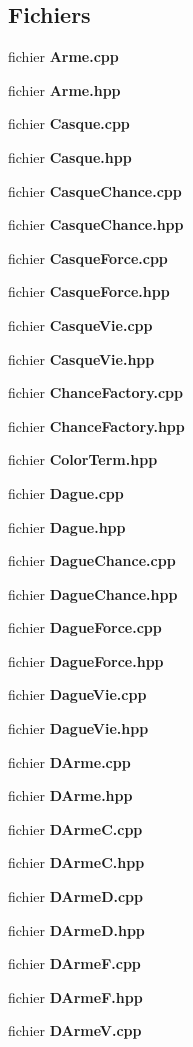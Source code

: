 \subsection*{Fichiers}
\begin{DoxyCompactItemize}
\item 
fichier {\bf Arme.\-cpp}
\item 
fichier {\bf Arme.\-hpp}
\item 
fichier {\bf Casque.\-cpp}
\item 
fichier {\bf Casque.\-hpp}
\item 
fichier {\bf Casque\-Chance.\-cpp}
\item 
fichier {\bf Casque\-Chance.\-hpp}
\item 
fichier {\bf Casque\-Force.\-cpp}
\item 
fichier {\bf Casque\-Force.\-hpp}
\item 
fichier {\bf Casque\-Vie.\-cpp}
\item 
fichier {\bf Casque\-Vie.\-hpp}
\item 
fichier {\bf Chance\-Factory.\-cpp}
\item 
fichier {\bf Chance\-Factory.\-hpp}
\item 
fichier {\bf Color\-Term.\-hpp}
\item 
fichier {\bf Dague.\-cpp}
\item 
fichier {\bf Dague.\-hpp}
\item 
fichier {\bf Dague\-Chance.\-cpp}
\item 
fichier {\bf Dague\-Chance.\-hpp}
\item 
fichier {\bf Dague\-Force.\-cpp}
\item 
fichier {\bf Dague\-Force.\-hpp}
\item 
fichier {\bf Dague\-Vie.\-cpp}
\item 
fichier {\bf Dague\-Vie.\-hpp}
\item 
fichier {\bf D\-Arme.\-cpp}
\item 
fichier {\bf D\-Arme.\-hpp}
\item 
fichier {\bf D\-Arme\-C.\-cpp}
\item 
fichier {\bf D\-Arme\-C.\-hpp}
\item 
fichier {\bf D\-Arme\-D.\-cpp}
\item 
fichier {\bf D\-Arme\-D.\-hpp}
\item 
fichier {\bf D\-Arme\-F.\-cpp}
\item 
fichier {\bf D\-Arme\-F.\-hpp}
\item 
fichier {\bf D\-Arme\-V.\-cpp}
\item 

\end{DoxyCompactItemize}
